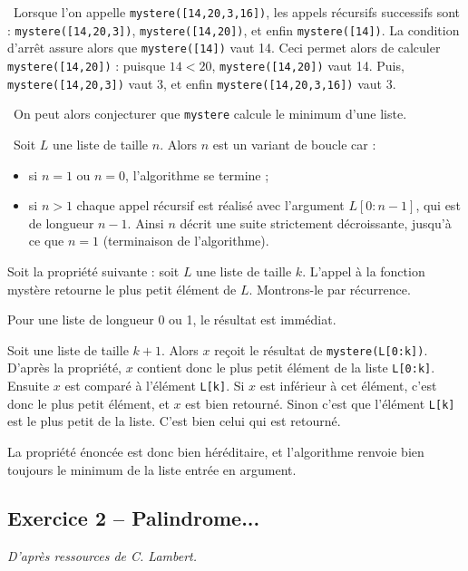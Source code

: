 \ifprof
\begin{corrige}

\question\ 
Lorsque l'on appelle \texttt{mystere([14,20,3,16])}, les appels récursifs successifs sont : 
\texttt{mystere([14,20,3])}, \texttt{mystere([14,20])}, et enfin \texttt{mystere([14])}. La condition d'arrêt assure 
alors que \texttt{mystere([14])} vaut 14. Ceci permet alors de calculer \texttt{mystere([14,20])} : puisque $14<20$, 
\texttt{mystere([14,20])} vaut 14. Puis, \texttt{mystere([14,20,3])} vaut 3, et enfin 
\texttt{mystere([14,20,3,16])} vaut 3.

\question\ 
On peut alors conjecturer que \texttt{mystere} calcule le minimum d'une liste.
\setcounter{subparagraph}{3}

\question\ 
Soit $L$ une liste de taille $n$. Alors $n$ est un variant de boucle car : 
\begin{itemize}
\item si $n=1$ ou $n=0$, l'algorithme se termine ;
\item si $n>1$ chaque appel récursif est réalisé avec l'argument $L[0:n-1]$, qui est de longueur $n-1$. Ainsi $n$ 
décrit une suite strictement décroissante, jusqu'à ce que $n=1$ (terminaison de l'algorithme). 
\end{itemize}

\vspace{.25cm}

Soit la propriété suivante : soit $L$ une liste de taille $k$. L'appel à la fonction mystère retourne le plus petit 
élément de $L$. Montrons-le par récurrence.

Pour une liste de longueur 0 ou 1, le résultat est immédiat.

Soit une liste de taille $k+1$.  Alors $x$ reçoit le résultat de \texttt{mystere(L[0:k])}. D'après la propriété, $x$ 
contient donc le plus petit élément de la liste \texttt{L[0:k]}. Ensuite $x$ est comparé à l'élément \texttt{L[k]}. Si 
$x$ est inférieur à cet élément, c'est donc le plus petit élément, et $x$ est bien retourné. Sinon c'est que l'élément 
\texttt{L[k]} est le plus petit de la liste. C'est bien celui qui est retourné. 

La propriété énoncée est donc bien héréditaire, et l'algorithme renvoie bien toujours le minimum de la liste entrée en 
argument.

\setcounter{question}{0}

\end{corrige}
\else
\fi

\subsection*{Exercice 2 -- Palindrome...}
\setcounter{subparagraph}{0}
\ifprof
\else
\textit{D'après ressources de C. Lambert.}

